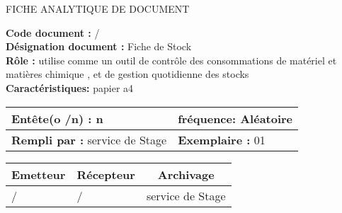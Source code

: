 

\newpage

\begin{center}
\Huge FICHE ANALYTIQUE DE DOCUMENT
\end{center}

\vspace{0.5cm}
    

\begin{flushleft}
\textbf{Code document :} / \\
\textbf{Désignation document :} Fiche de Stock \\
\textbf{Rôle :} utilise comme un outil de contrôle des consommations de matériel et matières chimique , et de gestion quotidienne des stocks \\
\textbf{Caractéristiques:} papier a4 \\
\end{flushleft}

\vspace{1cm}

\begin{table}[ht]
\begin{tabularx}{\textwidth}{|X|X|}

\hline
\textbf{Entête(o /n) :}  n   & \textbf{fréquence:} Aléatoire  \\
\hline
\textbf{Rempli par :}  service de Stage    & \textbf{Exemplaire :} 01  \\
\hline
\end{tabularx}
\end{table}

\vspace{1cm}

\begin{table}[ht]
\begin{tabularx}{\textwidth}{|X|X|X|}
  \hline
  \multicolumn{1}{|c|}{\centering\textbf{Emetteur}} & \multicolumn{1}{c|}{\centering\textbf{Récepteur}} & \multicolumn{1}{c|}{\centering\textbf{Archivage}} \\
  \hline
  / & / & service de Stage \\
  \hline
\end{tabularx}
\end{table}

\vspace{1cm}

